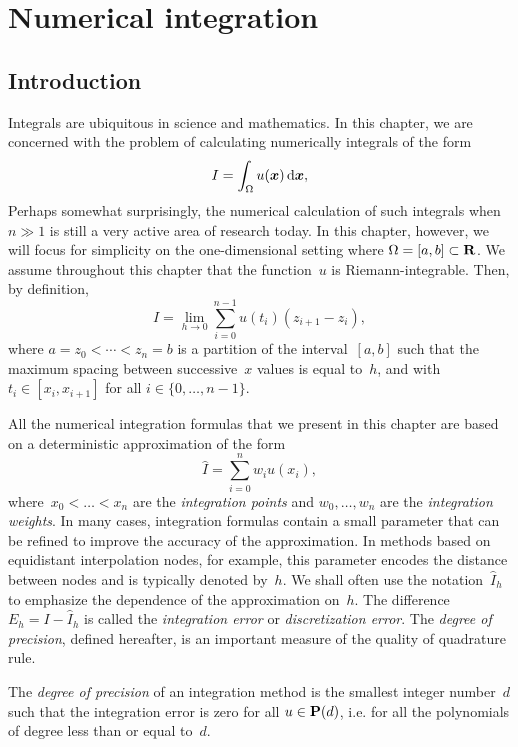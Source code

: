 \chapter{Numerical integration}
\label{cha:quadrature}

\minitoc

\section*{Introduction}
Integrals are ubiquitous in science and mathematics.
In this chapter,
we are concerned with the problem of calculating numerically integrals of the form
\begin{equation}
    \label{eq:integral}
    I = \int_{\Omega} u(\mathbf{\boldsymbol{x}}) \, \mathrm d \mathbf{\boldsymbol{x}},
\end{equation}
Perhaps somewhat surprisingly,
the numerical calculation of such integrals when $n \gg 1$ is still a very active area of research today.
In this chapter,
however,
we will focus for simplicity on the one-dimensional setting where $\Omega = [a, b] \subset \mathbf R$.
We assume throughout this chapter that the function~$u$ is Riemann-integrable.
Then, by definition,
\[
    I = \lim_{h \to 0}
    \sum_{i=0}^{n-1} u(t_i) (z_{i+1} - z_i),
\]
where $a = z_0 < \dotsb < z_n = b$ is a partition of the interval~$[a, b]$ such that the maximum spacing between successive~$x$ values is equal to~$h$,
and with $t_i \in [x_i, x_{i+1}]$ for all $i \in \{0, \dotsc, n-1\}$.

All the numerical integration formulas that we present in this chapter are based on a deterministic approximation of the form
\begin{equation}
    \label{eq:deterministic_integration}
    \widehat I = \sum_{i=0}^{n} w_i u(x_i),
\end{equation}
where~$x_0 < \dotsc < x_n$ are the \emph{integration points} and $w_0, \dotsc, w_n$ are the \emph{integration weights}.
In many cases, integration formulas contain a small parameter that can be refined to improve the accuracy of the approximation.
In methods based on equidistant interpolation nodes,
for example, this parameter encodes the distance between nodes and is typically denoted by~$h$.
We shall often use the notation~$\widehat I_h$ to emphasize the dependence of the approximation on~$h$.
The difference~$E_h = I - \widehat I_h$ is called the \emph{integration error} or \emph{discretization error}.
The \emph{degree of precision},
defined hereafter,
is an important measure of the quality of quadrature rule.
\begin{definition}
        The \emph{degree of precision} of an integration method is the smallest integer number~$d$ such that
        the integration error is zero for all $u \in \mathbf P(d)$,
        i.e. for all the polynomials of degree less than or equal to~$d$.
\end{definition}

